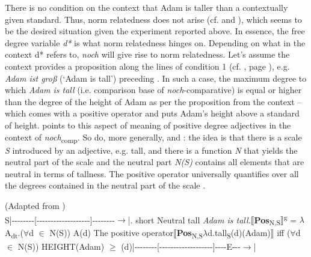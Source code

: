 \documentclass[output=paper]{langsci/langscibook}
\begin{document}
\noindent There is no condition on the context that Adam is taller than a contextually given standard. Thus, norm relatedness does not arise (cf. \citealt{umbach2009a_comp} and ), which seems to be the desired situation given the experiment reported above. In essence, the free degree variable \textit{d*} is what norm relatedness hinges on. Depending on what in the context d* refers to, \textit{noch} will give rise to norm relatedness. Let's assume the context provides a proposition along the lines of condition 1 (cf. , page \pageref{tab:4_conds}), e.g. \textit{Adam ist groß} (`Adam is tall') preceding . In such a case, the maximum degree to which \textit{Adam is tall} (i.e. comparison base of \textit{noch}-comparative) is equal or higher than the degree of the height of Adam as per the proposition from the context -- which comes with a positive operator and puts Adam's height above a standard of height. \citeauthor{umbach2009a_comp} \citeyearpar{umbach2009a_comp} points to this aspect of meaning of positive degree adjectives in the context of \textit{noch}\textsubscript{comp}. So do, more generally, \citet{vonStechow1984,stechow2006} and \citet{Beck2011}: the idea is that there is a scale \textit{S} introduced by an adjective, e.g. tall, and there is a function \textit{N} that yields the neutral part of the scale and the neutral part \textit{N(S)} contains all elements that are neutral in terms of tallness. The positive operator universally quantifies over all the degrees contained in the neutral part of the scale \citep{stechow2006}.

\ea (Adapted from \citealt[ex. 3-1--3-3]{stechow2006})\\ S\hspace{15pt}|{-}{-}{-}{-}{-}{-}{-}{-}{[}{-}{-}{-}{-}{-}{-}{-}{-}{-}{-}{-}{-}{-}{-}{-}{-}{-}{-}{-}{]}{-}{-}{-}{-}{-}{-}{-}{-}$\to$|\newline .\hspace{22pt} short \hspace{20pt} Neutral \hspace{25pt} tall
\ex \textit{Adam is tall.}\newline $⟦$\textbf{Pos}\textsubscript{N,S}$⟧$\textsuperscript{g} = $\lambda$A\textsubscript{dt}.(\textbf{$\forall$}d $\in$ N(S)) A(d) 
\ex  The positive operator\newline $⟦$\textbf{Pos}\textsubscript{N,S}$\lambda$d.tall\textsubscript{S}(d)(Adam)$⟧$ iff ($\forall$d $\in$ N(S)) HEIGHT(Adam) $\geq$ (d)\newline|{-}{-}{-}{-}{-}{-}{-}{-}{[}{-}{-}{-}{-}{-}{-}{-}{-}{-}{-}{-}{-}{-}{-}{-}{-}{-}{-}{-}{]}{-}{-}{-}{-}{E}{-}{-}{-}$\to$|\z
\end{document}
